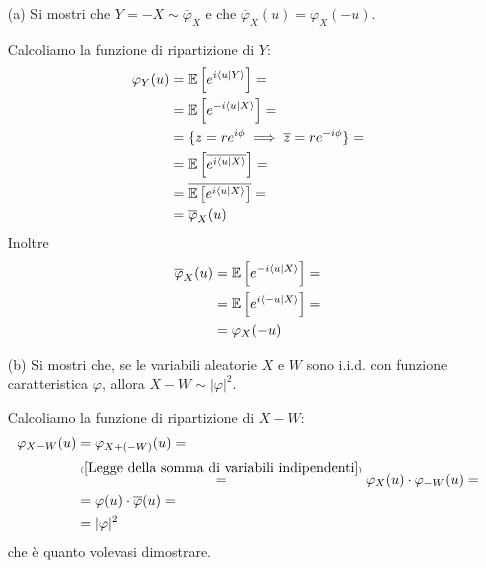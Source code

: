\Soluzione{} %
\begin{enumerate}
\item [(a)] Si mostri che $Y=-X\sim\overline{\varphi}_X$ e che $\overline{\varphi}_X(u)=\varphi_X(-u)$.

Calcoliamo la funzione di ripartizione di $Y$:
\begin{gather*}
\begin{aligned}
\varphi_Y(u)&=\mathbb{E}\left[e^{i\langle u|Y \rangle}  \right]=\\
&=\mathbb{E}\left[e^{-i\langle u|X \rangle}  \right]=\\
&=\{z=re^{i\phi}\implies \overline{z}=re^{-i\phi}  \}=\\
&=\mathbb{E}\left[\overline{e^{i\langle u|X \rangle}  }\right]=\\
&=\overline{\mathbb{E}\left[e^{i\langle u|X \rangle}  \right]}=\\
&=\overline{\varphi}_X(u)
\end{aligned}
\end{gather*}
Inoltre
\begin{gather*}
\begin{aligned}
\overline{\varphi}_X(u)&=\mathbb{E}\left[e^{-i\langle u|X \rangle}  \right]=\\
&=\mathbb{E}\left[e^{i\langle -u|X \rangle}  \right]=\\
&=\varphi_X(-u)
\end{aligned}
\end{gather*}

\item [(b)] Si mostri che, se le variabili aleatorie $X$ e $W$ sono i.i.d. con funzione caratteristica $\varphi$, allora $X-W\sim|\varphi|^2$.

Calcoliamo la funzione di ripartizione di $X-W$:
\begin{gather*}
\begin{aligned}
\varphi_{X-W}(u)&=\varphi_{X+(-W)}(u)=\\
&\overset{\underset{(\ref{Legge della somma di variabili indipendenti})}{}}{=}\varphi_X(u)\cdot \varphi_{-W}(u)=\\
&=\varphi(u)\cdot\overline{\varphi}(u)=\\
&=|\varphi|^2
\end{aligned}
\end{gather*}
che è quanto volevasi dimostrare.

\end{enumerate}

